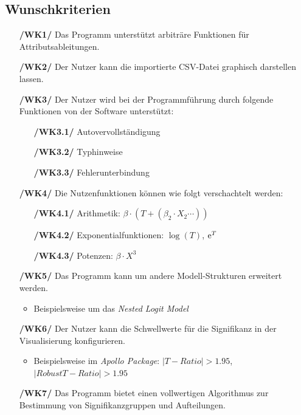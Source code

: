 \documentclass{article}
\begin{document}
\subsection{Wunschkriterien}
\begin{itemize}
    \item[\textbf{/WK1/}] Das Programm unterstützt arbiträre Funktionen für Attributsableitungen.
    \item[\textbf{/WK2/}] Der Nutzer kann die importierte CSV-Datei graphisch darstellen lassen.
    \item[\textbf{/WK3/}] Der Nutzer wird bei der Programmführung durch folgende Funktionen von der Software unterstützt:
    \begin{itemize}[leftmargin=.7in]
        \item[\textbf{/WK3.1/}] Autovervollständigung
        \item[\textbf{/WK3.2/}] Typhinweise
        \item[\textbf{/WK3.3/}] Fehlerunterbindung
    \end{itemize}
    \item[\textbf{/WK4/}] Die Nutzenfunktionen können wie folgt verschachtelt werden:
    \begin{itemize}[leftmargin=.7in]
        \item[\textbf{/WK4.1/}] Arithmetik: $\beta \cdot (T + (\beta_2 \cdot X_2 \cdots))$
        \item[\textbf{/WK4.2/}] Exponentialfunktionen: $\log(T)$, ${\rm e}^T$
        \item[\textbf{/WK4.3/}] Potenzen: $\beta \cdot X^3$
    \end{itemize}
    \item[\textbf{/WK5/}] Das Programm kann um andere Modell-Strukturen erweitert werden.
    \begin{itemize}
        \item Beispielsweise um das \textit{Nested Logit Model}
    \end{itemize}
    \item[\textbf{/WK6/}] Der Nutzer kann die Schwellwerte für die Signifikanz in der Visualisierung konfigurieren.
    \begin{itemize}
        \item Beispielsweise im \textit{Apollo Package}: $|T-Ratio | > 1.95$, $|Robust T-Ratio | > 1.95$
    \end{itemize}    
    \item[\textbf{/WK7/}] Das Programm bietet einen vollwertigen Algorithmus zur Bestimmung von Signifikanzgruppen und Aufteilungen.
    
\end{itemize}
\end{document}
